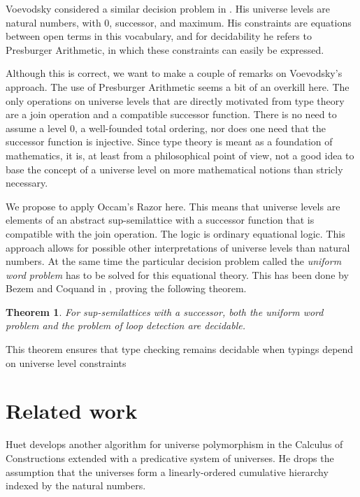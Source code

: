 \documentclass[11pt,a4paper]{article}
\newtheorem{theorem}{Theorem}[section]
\theoremstyle{definition}
\begin{document}
Voevodsky considered a similar decision problem in \cite[Section 2]{VV}.
His universe levels are natural numbers, with 0, successor, and maximum.
His constraints are equations between open terms in this vocabulary,
and for decidability he refers to Presburger Arithmetic,
in which these constraints can easily be expressed.

Although this is correct, we want to make a couple of remarks on Voevodsky's approach.
The use of Presburger Arithmetic seems a bit of an overkill here.
The only operations on universe levels that are directly motivated
from type theory are a join operation and a compatible successor function.
There is no need to assume a level 0, a well-founded total ordering,
nor does one need that the successor function is injective.
Since type theory is meant as a foundation of mathematics, it is,
at least from a philosophical point of view,
not a good idea to base the concept of a universe level
on more mathematical notions than stricly necessary.

We propose to apply Occam's Razor here. This means that universe levels
are elements of an abstract sup-semilattice with a successor function
that is compatible with the join operation. The logic is ordinary
equational logic.
This approach allows for possible other interpretations of universe levels
than natural numbers. At the same time the particular decision problem
called the \emph{uniform word problem} has to be solved for this equational theory.
This has been done by Bezem and Coquand in \cite{bezem-coquand:lattices},
proving the following theorem.

\begin{theorem}\label{thm:P-solvability}
For sup-semilattices with a successor, both the uniform word problem
and the problem of loop detection are decidable.
\end{theorem}
This theorem ensures that type checking remains decidable when
typings depend on universe level constraints


\section{Related work}

Huet \cite{Huet87} develops another algorithm for universe polymorphism
in the Calculus of Constructions extended with a predicative system of universes.
He drops the assumption that the universes form a linearly-ordered cumulative hierarchy indexed by the natural numbers.
\end{document}
